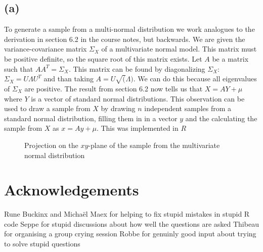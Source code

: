\documentclass[a4paper]{article}
\begin{document}
\subsection*{(a)}
To generate a sample from a multi-normal distribution we work analogues to the derivation in section 6.2 in the course notes, but backwards. We are given the variance-covariance matrix $\Sigma_X$ of a multivariate normal model. This matrix must be positive definite, so the square root of this matrix exists. 
Let $A$ be a matrix such that $AA^T=\Sigma_X$. This matrix can be found by diagonalizing $\Sigma_X$: $\Sigma_X=U\Lambda U^T$ and than taking $A = U \sqrt(\Lambda)$. We can do this because all eigenvalues of $\Sigma_X$ are positive.
The result from section 6.2 now tells us that $X = AY + \mu$ where $Y$ is a vector of standard normal distributions.
This observation can be used to draw a sample from $X$ by drawing $n$ independent samples from a standard normal distribution, filling them in in a vector $y$ and the calculating the sample from $X$ as $x=Ay+\mu$. This was implemented in $R$

\begin{figure}
	\centering
	
	\caption{Projection on the $xy$-plane of the sample from the multivariate normal distribution}
	\label{fig:sample}
\end{figure}

\section*{Acknowledgements}
Rune Buckinx and Michaël Maex for helping to fix stupid mistakes in stupid R code
Seppe for stupid discussions about how well the questions are asked
Thibeau for organising a group crying session
Robbe for genuinly good input about trying to solve stupid questions


\end{document}
